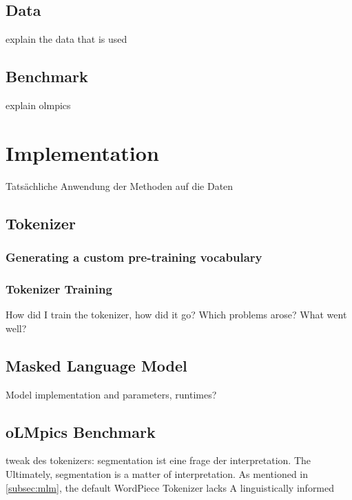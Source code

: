 \documentclass[english]{ttlab-qualify}
\begin{document}
    \subsection{Data}
    \label{subsec:data}
    explain the data that is used

    \subsection{Benchmark}
    \label{subsec:benchmark}
    explain olmpics

    \section{Implementation}
    \label{sec:implementation}

    Tatsächliche Anwendung der Methoden auf die Daten

    \subsection{Tokenizer}
    \label{subsec:tokenizer-training}

    \subsubsection{Generating a custom pre-training vocabulary}
    \label{subsubsec:generating-a-custom-pre-training-vocabulary}

    \subsubsection{Tokenizer Training}
    \label{subsubsec:tokenizer-training}
    How did I train the tokenizer, how did it go?
    Which problems arose? What went well?

    \subsection{Masked Language Model}
    \label{subsec:masked-language-model}
    Model implementation and parameters, runtimes?

    \subsection{oLMpics Benchmark}
    \label{subsec:olmpics-benchmark}



    tweak des tokenizers: segmentation ist eine frage der interpretation.
    The
    Ultimately, segmentation is a matter of interpretation.
    As mentioned in \ref{subsec:mlm}, the default WordPiece Tokenizer lacks
    A linguistically informed
\end{document}
